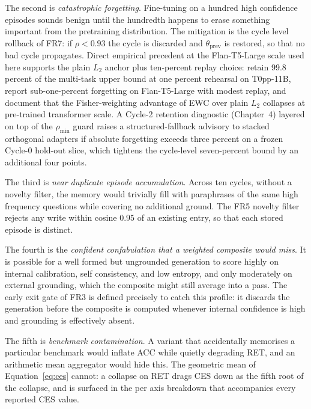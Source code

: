 The second is \emph{catastrophic forgetting}. Fine-tuning on a hundred high confidence episodes sounds benign until the hundredth happens to erase something important from the pretraining distribution. The mitigation is the cycle level rollback of FR7: if $\rho < 0.93$ the cycle is discarded and $\theta_{\mathrm{prev}}$ is restored, so that no bad cycle propagates. Direct empirical precedent at the Flan-T5-Large scale used here supports the plain $L_2$ anchor plus ten-percent replay choice: \citet{scialom2022fine} retain 99.8 percent of the multi-task upper bound at one percent rehearsal on T0pp-11B, \citet{jin2024forget} report sub-one-percent forgetting on Flan-T5-Large with modest replay, and \citet{mehta2023empirical} document that the Fisher-weighting advantage of EWC over plain $L_2$ collapses at pre-trained transformer scale. A Cycle-2 retention diagnostic (Chapter~4) layered on top of the $\rho_{\min}$ guard raises a structured-fallback advisory to stacked orthogonal adapters \citep{wang2023olora,biderman2024lora} if absolute forgetting exceeds three percent on a frozen Cycle-0 hold-out slice, which tightens the cycle-level seven-percent bound by an additional four points.

The third is \emph{near duplicate episode accumulation}. Across ten cycles, without a novelty filter, the memory would trivially fill with paraphrases of the same high frequency questions while covering no additional ground. The FR5 novelty filter rejects any write within cosine $0.95$ of an existing entry, so that each stored episode is distinct.

The fourth is the \emph{confident confabulation that a weighted composite would miss}. It is possible for a well formed but ungrounded generation to score highly on internal calibration, self consistency, and low entropy, and only moderately on external grounding, which the composite might still average into a pass. The early exit gate of FR3 is defined precisely to catch this profile: it discards the generation before the composite is computed whenever internal confidence is high and grounding is effectively absent.

The fifth is \emph{benchmark contamination}. A variant that accidentally memorises a particular benchmark would inflate ACC while quietly degrading RET, and an arithmetic mean aggregator would hide this. The geometric mean of Equation~\ref{eq:ces} cannot: a collapse on RET drags CES down as the fifth root of the collapse, and is surfaced in the per axis breakdown that accompanies every reported CES value.

